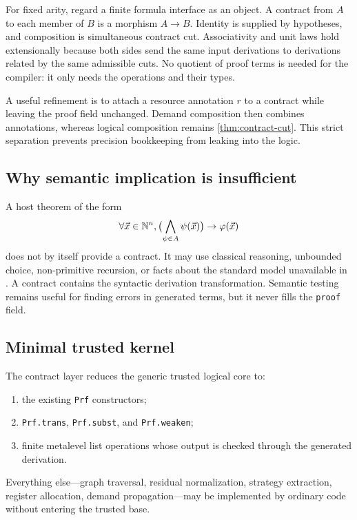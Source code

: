 For fixed arity, regard a finite formula interface as an object.  A contract from \(A\) to each member of \(B\) is a morphism \(A\to B\).  Identity is supplied by hypotheses, and composition is simultaneous contract cut.  Associativity and unit laws hold extensionally because both sides send the same input derivations to derivations related by the same admissible cuts.  No quotient of proof terms is needed for the compiler: it only needs the operations and their types.

A useful refinement is to attach a resource annotation \(r\) to a contract while leaving the proof field unchanged.  Demand composition then combines annotations, whereas logical composition remains \cref{thm:contract-cut}.  This strict separation prevents precision bookkeeping from leaking into the logic.

\subsection{Why semantic implication is insufficient}

A host theorem of the form
\[
       \forall\vec x\in\mathbb N^n,
       \bigl(\bigwedge_{\psi\in A}\psi(\vec x)\bigr)\to\varphi(\vec x)
\]
does not by itself provide a contract.  It may use classical reasoning, unbounded choice, non-primitive recursion, or facts about the standard model unavailable in \iPRA.  A contract contains the syntactic derivation transformation.  Semantic testing remains useful for finding errors in generated terms, but it never fills the \texttt{proof} field.

\subsection{Minimal trusted kernel}

The contract layer reduces the generic trusted logical core to:
\begin{enumerate}
  \item the existing \texttt{Prf} constructors;
  \item \texttt{Prf.trans}, \texttt{Prf.subst}, and \texttt{Prf.weaken};
  \item finite metalevel list operations whose output is checked through the generated derivation.
\end{enumerate}
Everything else---graph traversal, residual normalization, strategy extraction, register allocation, demand propagation---may be implemented by ordinary code without entering the trusted base.
